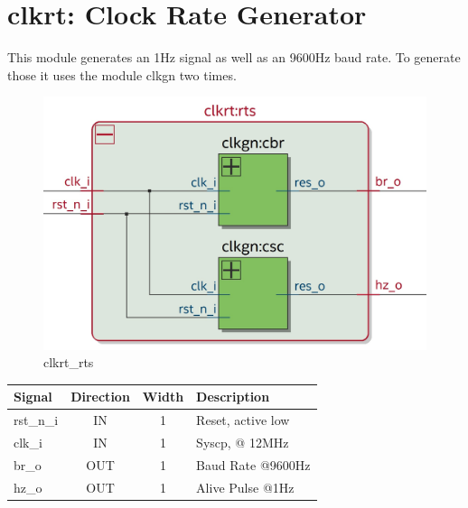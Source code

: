 \documentclass[12pt,a4 paper] {report}
\begin{document}
\section{clkrt: Clock Rate Generator}
This module generates an 1Hz signal as well as an 9600Hz baud rate. To generate those it uses the module clkgn two 
times.
\begin{figure}[h]
	\centering
	\includegraphics[scale=0.15]{../png/clkrt_rts.png}
	\caption{clkrt\_rts}
\end{figure}
\begin{center}
	\begin{tabular}{ | p{2cm} | c | c | p{5cm} |}
		\hline
		\textbf{Signal} & \textbf{Direction} & \textbf{Width} & \textbf{Description} \\
		\hline	
		rst\_n\_i & IN & 1 & Reset, active low \\
		\hline
		clk\_i & IN & 1 & Syscp, @ 12MHz \\
		\hline
		br\_o & OUT & 1 & Baud Rate @9600Hz \\
		\hline
		hz\_o & OUT & 1 & Alive Pulse @1Hz \\
		\hline
	\end{tabular}
\end{center}

\newpage
\end{document}
